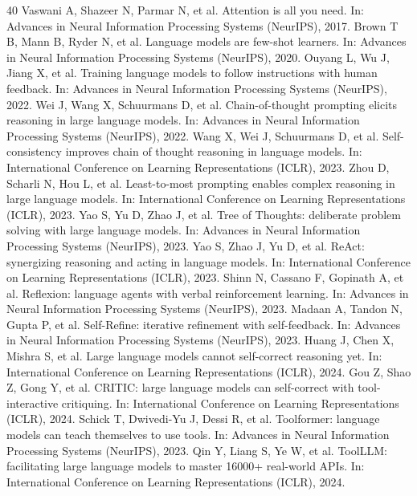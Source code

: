 \documentclass[journal,10pt,a4paper]{IEEEtran}
\begin{document}
\begin{thebibliography}{40}
 Vaswani A, Shazeer N, Parmar N, et al. Attention is all you need. In: Advances in Neural Information Processing Systems (NeurIPS), 2017.
 Brown T B, Mann B, Ryder N, et al. Language models are few-shot learners. In: Advances in Neural Information Processing Systems (NeurIPS), 2020.
 Ouyang L, Wu J, Jiang X, et al. Training language models to follow instructions with human feedback. In: Advances in Neural Information Processing Systems (NeurIPS), 2022.
 Wei J, Wang X, Schuurmans D, et al. Chain-of-thought prompting elicits reasoning in large language models. In: Advances in Neural Information Processing Systems (NeurIPS), 2022.
 Wang X, Wei J, Schuurmans D, et al. Self-consistency improves chain of thought reasoning in language models. In: International Conference on Learning Representations (ICLR), 2023.
 Zhou D, Scharli N, Hou L, et al. Least-to-most prompting enables complex reasoning in large language models. In: International Conference on Learning Representations (ICLR), 2023.
 Yao S, Yu D, Zhao J, et al. Tree of Thoughts: deliberate problem solving with large language models. In: Advances in Neural Information Processing Systems (NeurIPS), 2023.
 Yao S, Zhao J, Yu D, et al. ReAct: synergizing reasoning and acting in language models. In: International Conference on Learning Representations (ICLR), 2023.
 Shinn N, Cassano F, Gopinath A, et al. Reflexion: language agents with verbal reinforcement learning. In: Advances in Neural Information Processing Systems (NeurIPS), 2023.
 Madaan A, Tandon N, Gupta P, et al. Self-Refine: iterative refinement with self-feedback. In: Advances in Neural Information Processing Systems (NeurIPS), 2023.
 Huang J, Chen X, Mishra S, et al. Large language models cannot self-correct reasoning yet. In: International Conference on Learning Representations (ICLR), 2024.
 Gou Z, Shao Z, Gong Y, et al. CRITIC: large language models can self-correct with tool-interactive critiquing. In: International Conference on Learning Representations (ICLR), 2024.
 Schick T, Dwivedi-Yu J, Dessi R, et al. Toolformer: language models can teach themselves to use tools. In: Advances in Neural Information Processing Systems (NeurIPS), 2023.
 Qin Y, Liang S, Ye W, et al. ToolLLM: facilitating large language models to master 16000+ real-world APIs. In: International Conference on Learning Representations (ICLR), 2024.

\end{thebibliography}
\end{document}
